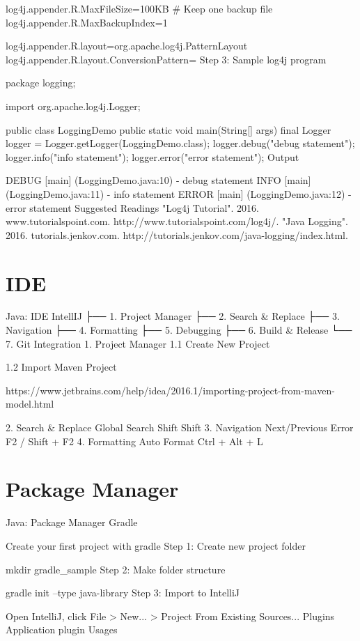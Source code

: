 log4j.appender.R.MaxFileSize=100KB
# Keep one backup file
log4j.appender.R.MaxBackupIndex=1

log4j.appender.R.layout=org.apache.log4j.PatternLayout
log4j.appender.R.layout.ConversionPattern=%
Step 3: Sample log4j program

package logging;

import org.apache.log4j.Logger;

public class LoggingDemo {
    public static void main(String[] args) {
        final Logger logger = Logger.getLogger(LoggingDemo.class);
        logger.debug("debug statement");
        logger.info("info statement");
        logger.error("error statement");
    }
}
Output

DEBUG [main] (LoggingDemo.java:10) - debug statement
 INFO [main] (LoggingDemo.java:11) - info statement
ERROR [main] (LoggingDemo.java:12) - error statement
Suggested Readings
"Log4j Tutorial". 2016. www.tutorialspoint.com. http://www.tutorialspoint.com/log4j/.
"Java Logging". 2016. tutorials.jenkov.com. http://tutorials.jenkov.com/java-logging/index.html.

\section{IDE}

Java: IDE
IntellIJ
├── 1. Project Manager
├── 2. Search & Replace
├── 3. Navigation
├── 4. Formatting
├── 5. Debugging
├── 6. Build & Release
└── 7. Git Integration
1. Project Manager
1.1 Create New Project

1.2 Import Maven Project

https://www.jetbrains.com/help/idea/2016.1/importing-project-from-maven-model.html

2. Search & Replace
Global Search	Shift Shift
3. Navigation
Next/Previous Error	F2 / Shift + F2
4. Formatting
Auto Format	Ctrl + Alt + L

\section{Package Manager}

Java: Package Manager
Gradle


Create your first project with gradle
Step 1: Create new project folder

mkdir gradle_sample
Step 2: Make folder structure

gradle init --type java-library
Step 3: Import to IntelliJ

Open IntelliJ, click File > New... > Project From Existing Sources...
Plugins
Application plugin
Usages

